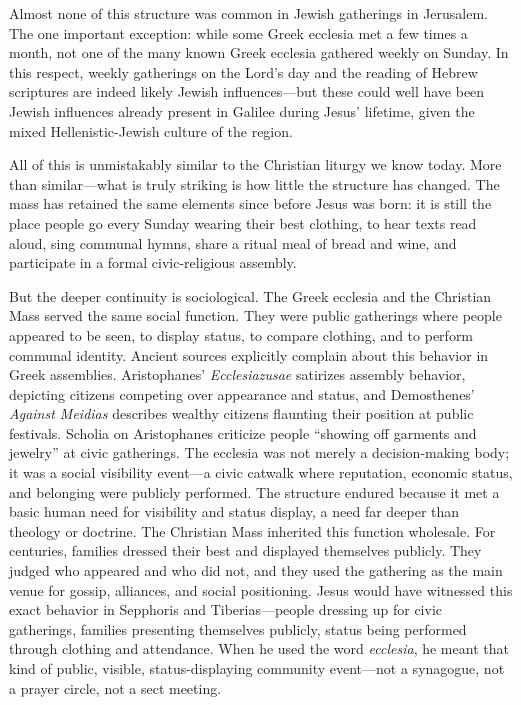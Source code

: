Almost none of this structure was common in Jewish gatherings in Jerusalem.
The one important exception: while some Greek ecclesia met a few times a month, not one of the many known Greek ecclesia gathered weekly on Sunday.
In this respect, weekly gatherings on the Lord's day and the reading of Hebrew scriptures are indeed likely Jewish influences---but these could well have been Jewish influences already present in Galilee during Jesus' lifetime, given the mixed Hellenistic-Jewish culture of the region.

All of this is unmistakably similar to the Christian liturgy we know today.
More than similar---what is truly striking is how little the structure has changed.
The mass has retained the same elements since before Jesus was born: it is still the place people go every Sunday wearing their best clothing, to hear texts read aloud, sing communal hymns, share a ritual meal of bread and wine, and participate in a formal civic-religious assembly.

But the deeper continuity is sociological.
The Greek ecclesia and the Christian Mass served the same social function.
They were public gatherings where people appeared to be seen, to display status, to compare clothing, and to perform communal identity.
Ancient sources explicitly complain about this behavior in Greek assemblies.
Aristophanes' \emph{Ecclesiazusae} satirizes assembly behavior, depicting citizens competing over appearance and status, and Demosthenes' \emph{Against Meidias} describes wealthy citizens flaunting their position at public festivals.
Scholia on Aristophanes criticize people ``showing off garments and jewelry'' at civic gatherings.
The ecclesia was not merely a decision-making body; it was a social visibility event---a civic catwalk where reputation, economic status, and belonging were publicly performed.
The structure endured because it met a basic human need for visibility and status display, a need far deeper than theology or doctrine.
The Christian Mass inherited this function wholesale.
For centuries, families dressed their best and displayed themselves publicly.
They judged who appeared and who did not, and they used the gathering as the main venue for gossip, alliances, and social positioning.
Jesus would have witnessed this exact behavior in Sepphoris and Tiberias---people dressing up for civic gatherings, families presenting themselves publicly, status being performed through clothing and attendance.
When he used the word \emph{ecclesia}, he meant that kind of public, visible, status-displaying community event---not a synagogue, not a prayer circle, not a sect meeting.

